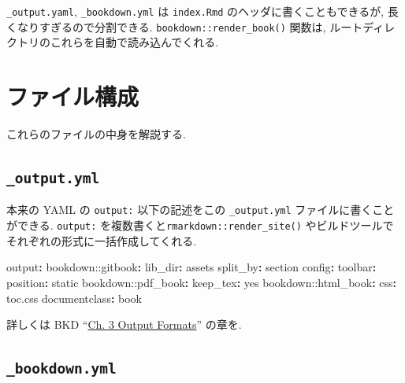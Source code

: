 \documentclass[
  nomag]{bxjsbook}
\newenvironment{Shaded}{\begin{snugshade}}{\end{snugshade}}
\newcommand{\AttributeTok}[1]{\textcolor[rgb]{0.77,0.63,0.00}{#1}}
\newcommand{\CharTok}[1]{\textcolor[rgb]{0.31,0.60,0.02}{#1}}
\newcommand{\FunctionTok}[1]{\textcolor[rgb]{0.00,0.00,0.00}{#1}}
\newcommand{\KeywordTok}[1]{\textcolor[rgb]{0.13,0.29,0.53}{\textbf{#1}}}
\theoremstyle{definition}
\theoremstyle{definition}
\theoremstyle{definition}
\theoremstyle{remark}
\begin{document}
\texttt{\_output.yaml}, \texttt{\_bookdown.yml} は \texttt{index.Rmd}
のヘッダに書くこともできるが, 長くなりすぎるので分割できる.
\texttt{bookdown::render\_book()} 関数は,
ルートディレクトリのこれらを自動で読み込んでくれる.

\hypertarget{ux30d5ux30a1ux30a4ux30ebux69cbux6210}{%
\section{ファイル構成}\label{ux30d5ux30a1ux30a4ux30ebux69cbux6210}}

これらのファイルの中身を解説する.

\hypertarget{output.yml}{%
\subsection{\texorpdfstring{\texttt{\_output.yml}}{\_output.yml}}\label{output.yml}}

本来の YAML の \texttt{output:} 以下の記述をこの \texttt{\_output.yml}
ファイルに書くことができる. \texttt{output:}
を複数書くと\texttt{rmarkdown::render\_site()}
やビルドツールでそれぞれの形式に一括作成してくれる.

\begin{Shaded}
\begin{Highlighting}[]
\FunctionTok{output}\KeywordTok{:}
\AttributeTok{  bookdown:}\FunctionTok{:gitbook}\KeywordTok{:}
\AttributeTok{    }\FunctionTok{lib\_dir}\KeywordTok{:}\AttributeTok{ assets}
\AttributeTok{    }\FunctionTok{split\_by}\KeywordTok{:}\AttributeTok{ section}
\AttributeTok{    }\FunctionTok{config}\KeywordTok{:}
\AttributeTok{      }\FunctionTok{toolbar}\KeywordTok{:}
\AttributeTok{        }\FunctionTok{position}\KeywordTok{:}\AttributeTok{ static}
\AttributeTok{  bookdown:}\FunctionTok{:pdf\_book}\KeywordTok{:}
\AttributeTok{    }\FunctionTok{keep\_tex}\KeywordTok{:}\AttributeTok{ }\CharTok{yes}
\AttributeTok{  bookdown:}\FunctionTok{:html\_book}\KeywordTok{:}
\AttributeTok{    }\FunctionTok{css}\KeywordTok{:}\AttributeTok{ toc.css}
\FunctionTok{documentclass}\KeywordTok{:}\AttributeTok{ book}
\end{Highlighting}
\end{Shaded}

詳しくは BKD
``\href{https://bookdown.org/yihui/bookdown/output-formats.html}{Ch. 3
Output Formats}'' の章を.

\hypertarget{bookdown.yml}{%
\subsection{\texorpdfstring{\texttt{\_bookdown.yml}}{\_bookdown.yml}}\label{bookdown.yml}}
\end{document}
